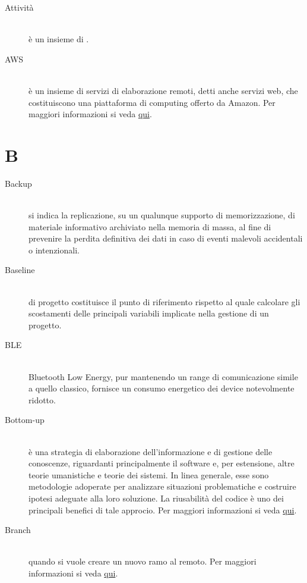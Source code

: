 \documentclass[12pt,a4paper]{article}
\begin{document}
\begin{description}
\item[Attività]
\hfill\\è un insieme di .

\item[AWS]
\hfill\\è un insieme di servizi di elaborazione remoti, detti anche servizi web, che costituiscono una piattaforma di computing offerto da Amazon. Per maggiori informazioni si veda \href{https://aws.amazon.com/it/}{qui}.
\end{description}

\newpage

\section{B}

\begin{description}
\item[Backup]
\hfill\\si indica la replicazione, su un qualunque supporto di memorizzazione, di materiale informativo archiviato nella memoria di massa, al fine di prevenire la perdita definitiva dei dati in caso di eventi malevoli accidentali o intenzionali.

\item[Baseline]
\hfill\\ di progetto costituisce il punto di riferimento rispetto al quale calcolare gli scostamenti delle principali variabili implicate nella gestione di un progetto.

\item[BLE]
\hfill\\ Bluetooth Low Energy,  pur mantenendo un range di comunicazione simile a quello classico, fornisce un  consumo energetico dei device notevolmente ridotto.

\item[Bottom-up]
\hfill\\è una strategia di elaborazione dell'informazione e di gestione delle conoscenze, riguardanti principalmente il software e, per estensione, altre teorie umanistiche e teorie dei sistemi. In linea generale, esse sono metodologie adoperate per analizzare situazioni problematiche e costruire ipotesi adeguate alla loro soluzione. La riusabilità del codice è uno dei principali benefici di tale approcio. Per maggiori informazioni si veda \href{https://it.wikipedia.org/wiki/Progettazione_top-down_e_bottom-up}{qui}.

\item[Branch]
\hfill\\ quando si vuole creare un nuovo ramo al  remoto. Per maggiori informazioni si veda \href{https://git-scm.com/docs/}{qui}.


\end{description}
\end{document}
